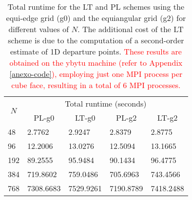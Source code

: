 \begin{table}[!h]
	\begin{tabular}{|l|llll|}
		\hline
		\multicolumn{1}{|c|}{\multirow{2}{*}{\textbf{$N$}}} & \multicolumn{4}{c|}{Total runtime (seconds)}                                                                              \\ \cline{2-5} 
		\multicolumn{1}{|c|}{}                              & \multicolumn{1}{c|}{PL-g0}     & \multicolumn{1}{c|}{LT-g0}     & \multicolumn{1}{c|}{PL-g2}     & \multicolumn{1}{c|}{LT-g2} \\ \hline
		48                                                  & \multicolumn{1}{l|}{2.7762}    & \multicolumn{1}{l|}{2.9247}    & \multicolumn{1}{l|}{2.8379 }    & 2.8775                     \\ \hline
		96                                                  & \multicolumn{1}{l|}{12.2006}   & \multicolumn{1}{l|}{13.0276}   & \multicolumn{1}{l|}{12.5094}   & 13.1665                     \\ \hline
		192                                                 & \multicolumn{1}{l|}{89.2555}   & \multicolumn{1}{l|}{95.9484}   & \multicolumn{1}{l|}{90.1434}   & 96.4775                    \\ \hline
		384                                                 & \multicolumn{1}{l|}{719.8602}  & \multicolumn{1}{l|}{759.0486}  & \multicolumn{1}{l|}{705.6963}  & 743.4566                   \\ \hline
		768                                                 & \multicolumn{1}{l|}{7308.6683} & \multicolumn{1}{l|}{7529.9261} & \multicolumn{1}{l|}{7190.8789} & 7418.2488                  \\ \hline
	\end{tabular}
	\caption{Total runtime for the LT and PL schemes using the equi-edge grid (g0) and the equiangular grid (g2) for different values of $N$.
		The additional cost of the LT scheme is due to the computation of a second-order estimate of 1D departure points.
	\textcolor{red}{These results are obtained on the ybytu machine (refer to Appendix \ref{anexo-code}), 
	employing just one MPI process per cube face, resulting in a total of 6 MPI processes.}}
\label{sw-time}
\end{table}


\newpage

